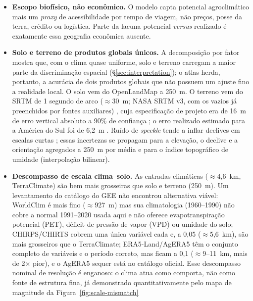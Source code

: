 \begin{itemize}
  \item \textbf{Escopo biofísico, não econômico.} O modelo capta potencial agroclimático mais
    um \emph{proxy} de acessibilidade por tempo de viagem, não preços, posse da terra,
    crédito ou logística. Parte da lacuna potencial \emph{versus} realizado é exatamente essa
    geografia econômica ausente.
  \item \textbf{Solo e terreno de produtos globais únicos.} A decomposição por fator mostra que,
    com o clima quase uniforme, solo e terreno carregam a maior parte da discriminação espacial
    (\S\ref{sec:interpretation}); o atlas herda, portanto, a acurácia de dois produtos globais que não
    possuem um ajuste fino a realidade local. O solo vem do
    OpenLandMap a 250~m. O terreno vem do SRTM de 1 segundo de arco ($\approx$30~m; NASA SRTM v3,
    com os vazios já preenchidos por fontes auxiliares) \citep{farr_shuttle_2007}, cuja especificação
    de projeto era de 16~m de erro vertical absoluto a 90\% de confiança \citep[p.~3]{farr_shuttle_2007};
    o erro realizado estimado para a América do Sul foi de 6,2~m \citep[tab.~1, p.~21]{farr_shuttle_2007}.
    Ruído de \emph{speckle} tende a inflar declives em escalas curtas \citep[p.~19]{farr_shuttle_2007};
    essas incertezas se propagam para a elevação, o declive e a orientação agregados a 250~m por média
    e para o índice topográfico de umidade (interpolação bilinear).
  \item \textbf{Descompasso de escala clima--solo.} As entradas climáticas ($\approx$4,6~km,
    TerraClimate) são bem mais grosseiras que solo e terreno (250~m). Um levantamento do
    catálogo do GEE não encontrou alternativa viável: WorldClim é mais fino ($\approx$927~m) mas
    sua climatologia (1960--1990) não cobre a normal 1991--2020 usada aqui e não oferece
    evapotranspiração potencial (PET), déficit de pressão de vapor (VPD) ou umidade do solo;
    CHIRPS/CHIRTS cobrem uma única variável cada e, a 0,05\textdegree{} ($\approx$5,6~km), são
    mais grosseiros que o TerraClimate; ERA5-Land/AgERA5 têm o conjunto completo de variáveis e
    o período correto, mas ficam a 0,1\textdegree{} ($\approx$9--11~km, mais de 2$\times$ pior),
    e o AgERA5 sequer está no catálogo oficial. Esse descompasso nominal de resolução é
    enganoso: o clima atua como comporta, não como fonte de estrutura fina, já demonstrado
    quantitativamente pelo mapa de magnitude da Figura~\ref{fig:scale-mismatch}

\end{itemize}
